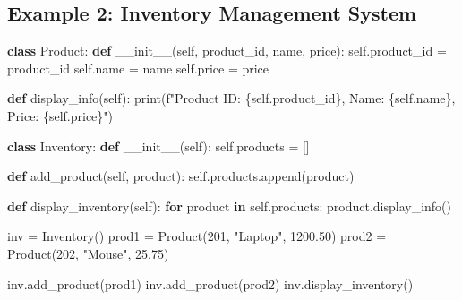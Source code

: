 \documentclass[
  letterpaper,
  DIV=11,
  numbers=noendperiod]{scrreprt}
\newenvironment{Shaded}{\begin{snugshade}}{\end{snugshade}}
\newcommand{\BuiltInTok}[1]{\textcolor[rgb]{0.00,0.23,0.31}{#1}}
\newcommand{\ControlFlowTok}[1]{\textcolor[rgb]{0.00,0.23,0.31}{\textbf{#1}}}
\newcommand{\DecValTok}[1]{\textcolor[rgb]{0.68,0.00,0.00}{#1}}
\newcommand{\FloatTok}[1]{\textcolor[rgb]{0.68,0.00,0.00}{#1}}
\newcommand{\FunctionTok}[1]{\textcolor[rgb]{0.28,0.35,0.67}{#1}}
\newcommand{\KeywordTok}[1]{\textcolor[rgb]{0.00,0.23,0.31}{\textbf{#1}}}
\newcommand{\NormalTok}[1]{\textcolor[rgb]{0.00,0.23,0.31}{#1}}
\newcommand{\OperatorTok}[1]{\textcolor[rgb]{0.37,0.37,0.37}{#1}}
\newcommand{\SpecialCharTok}[1]{\textcolor[rgb]{0.37,0.37,0.37}{#1}}
\newcommand{\SpecialStringTok}[1]{\textcolor[rgb]{0.13,0.47,0.30}{#1}}
\newcommand{\StringTok}[1]{\textcolor[rgb]{0.13,0.47,0.30}{#1}}
\newcommand{\VariableTok}[1]{\textcolor[rgb]{0.07,0.07,0.07}{#1}}
\begin{document}
\subsection{Example 2: Inventory Management
System}\label{example-2-inventory-management-system}

\begin{Shaded}
\begin{Highlighting}[]
\KeywordTok{class}\NormalTok{ Product:}
    \KeywordTok{def} \FunctionTok{\_\_init\_\_}\NormalTok{(}\VariableTok{self}\NormalTok{, product\_id, name, price):}
        \VariableTok{self}\NormalTok{.product\_id }\OperatorTok{=}\NormalTok{ product\_id}
        \VariableTok{self}\NormalTok{.name }\OperatorTok{=}\NormalTok{ name}
        \VariableTok{self}\NormalTok{.price }\OperatorTok{=}\NormalTok{ price}

    \KeywordTok{def}\NormalTok{ display\_info(}\VariableTok{self}\NormalTok{):}
        \BuiltInTok{print}\NormalTok{(}\SpecialStringTok{f"Product ID: }\SpecialCharTok{\{}\VariableTok{self}\SpecialCharTok{.}\NormalTok{product\_id}\SpecialCharTok{\}}\SpecialStringTok{, Name: }\SpecialCharTok{\{}\VariableTok{self}\SpecialCharTok{.}\NormalTok{name}\SpecialCharTok{\}}\SpecialStringTok{, Price: }\SpecialCharTok{\{}\VariableTok{self}\SpecialCharTok{.}\NormalTok{price}\SpecialCharTok{\}}\SpecialStringTok{"}\NormalTok{)}

\KeywordTok{class}\NormalTok{ Inventory:}
    \KeywordTok{def} \FunctionTok{\_\_init\_\_}\NormalTok{(}\VariableTok{self}\NormalTok{):}
        \VariableTok{self}\NormalTok{.products }\OperatorTok{=}\NormalTok{ []}

    \KeywordTok{def}\NormalTok{ add\_product(}\VariableTok{self}\NormalTok{, product):}
        \VariableTok{self}\NormalTok{.products.append(product)}

    \KeywordTok{def}\NormalTok{ display\_inventory(}\VariableTok{self}\NormalTok{):}
        \ControlFlowTok{for}\NormalTok{ product }\KeywordTok{in} \VariableTok{self}\NormalTok{.products:}
\NormalTok{            product.display\_info()}

\NormalTok{inv }\OperatorTok{=}\NormalTok{ Inventory()}
\NormalTok{prod1 }\OperatorTok{=}\NormalTok{ Product(}\DecValTok{201}\NormalTok{, }\StringTok{"Laptop"}\NormalTok{, }\FloatTok{1200.50}\NormalTok{)}
\NormalTok{prod2 }\OperatorTok{=}\NormalTok{ Product(}\DecValTok{202}\NormalTok{, }\StringTok{"Mouse"}\NormalTok{, }\FloatTok{25.75}\NormalTok{)}

\NormalTok{inv.add\_product(prod1)}
\NormalTok{inv.add\_product(prod2)}
\NormalTok{inv.display\_inventory()}
\end{Highlighting}
\end{Shaded}
\end{document}
